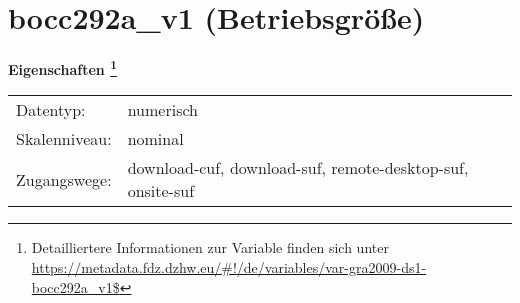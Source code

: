 
    \setcounter{footnote}{0}

    \vspace*{-1.8cm}
	\section{bocc292a\_v1 (Betriebsgröße)}
	\label{section:bocc292a_v1}



    \vspace*{0.5cm}
    \noindent\textbf{Eigenschaften
	\footnote{Detailliertere Informationen zur Variable finden sich unter
		\url{https://metadata.fdz.dzhw.eu/\#!/de/variables/var-gra2009-ds1-bocc292a_v1$}}}\\
	\begin{tabularx}{\hsize}{@{}lX}
	Datentyp: & numerisch \\
	Skalenniveau: & nominal \\
	Zugangswege: &
	  download-cuf, 
	  download-suf, 
	  remote-desktop-suf, 
	  onsite-suf
 \\
    \end{tabularx}



